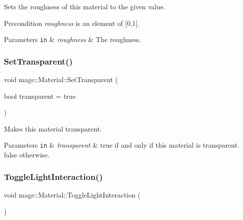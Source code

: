 Sets the roughness of this material to the given value.

\begin{DoxyPrecond}{Precondition}
{\itshape roughness} is an element of \mbox{[}0,1\mbox{]}. 
\end{DoxyPrecond}

\begin{DoxyParams}[1]{Parameters}
\mbox{\tt in}  & {\em roughness} & The roughness. \\
\hline
\end{DoxyParams}
\hypertarget{classmage_1_1_material_abf7e618017185ea05c72d050e89018fe}{}\label{classmage_1_1_material_abf7e618017185ea05c72d050e89018fe} 
\subsubsection{\texorpdfstring{Set\+Transparent()}{SetTransparent()}}
{\footnotesize\ttfamily void mage\+::\+Material\+::\+Set\+Transparent (\begin{DoxyParamCaption}\item[{bool}]{transparent = {\ttfamily true} }\end{DoxyParamCaption})\hspace{0.3cm}{\ttfamily [noexcept]}}

Makes this material transparent.


\begin{DoxyParams}[1]{Parameters}
\mbox{\tt in}  & {\em transparent} & {\ttfamily true} if and only if this material is transparent. {\ttfamily false} otherwise. \\
\hline
\end{DoxyParams}
\hypertarget{classmage_1_1_material_a9c8c15d426461b4a597b9a9947a7bd62}{}\label{classmage_1_1_material_a9c8c15d426461b4a597b9a9947a7bd62} 
\subsubsection{\texorpdfstring{Toggle\+Light\+Interaction()}{ToggleLightInteraction()}}
{\footnotesize\ttfamily void mage\+::\+Material\+::\+Toggle\+Light\+Interaction (\begin{DoxyParamCaption}{ }\end{DoxyParamCaption})\hspace{0.3cm}{\ttfamily [noexcept]}}

